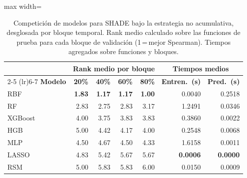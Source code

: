 \begin{table}[H]
    \centering
    \small
    \setlength{\tabcolsep}{4pt}
    \begin{adjustbox}{max width=\textwidth}
        \begin{tabular}{lrrrr|rr}
            \toprule
            \multicolumn{1}{l}{} & \multicolumn{4}{c}{\textbf{Rank medio por bloque}} & \multicolumn{2}{c}{\textbf{Tiempos medios}} \\
            \cmidrule(lr){2-5} \cmidrule(lr){6-7}
            \textbf{Modelo} & \textbf{20\%} & \textbf{40\%} & \textbf{60\%} & \textbf{80\%} & \textbf{Entren.\ (s)} & \textbf{Pred.\ (s)} \\
            \midrule
            RBF & \textbf{1.83} & \textbf{1.17} & \textbf{1.17} & \textbf{1.00} & 0.0040 & 0.2518 \\
            RF & 2.83 & 2.75 & 2.83 & 3.17 & 1.2491 & 0.0346 \\
            XGBoost & 4.00 & 3.75 & 3.83 & 3.83 & 0.3860 & 0.0022 \\
            HGB & 5.00 & 4.42 & 4.17 & 4.00 & 0.2548 & 0.0068 \\
            MLP & 4.50 & 4.67 & 4.50 & 4.33 & 1.6158 & 0.0011 \\
            LASSO & 4.83 & 5.42 & 5.67 & 5.67 & \textbf{0.0006} & \textbf{0.0000} \\
            RSM & 5.00 & 5.83 & 5.83 & 6.00 & 0.0150 & 0.0009 \\
            \bottomrule
        \end{tabular}
    \end{adjustbox}
    \caption{Competición de modelos para SHADE bajo la estrategia no acumulativa, desglosada por bloque temporal. Rank medio calculado sobre las funciones de prueba para cada bloque de validación (1\,=\,mejor Spearman). Tiempos agregados sobre funciones y bloques.}
    \label{tab:comparativa_modelos_bloques_shade}
\end{table}
